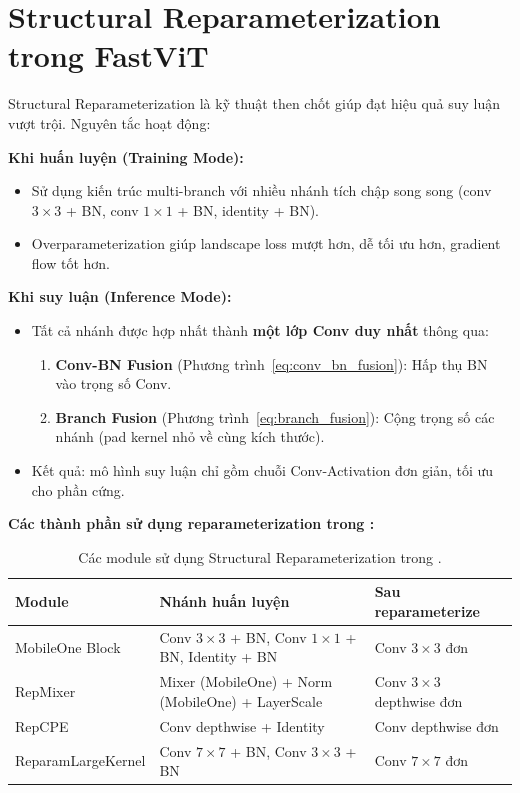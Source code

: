 \section{Structural Reparameterization trong FastViT}
\label{sec:reparameterization}

Structural Reparameterization là kỹ thuật then chốt giúp \fastvit{} đạt hiệu quả suy luận vượt trội. Nguyên tắc hoạt động:

\textbf{Khi huấn luyện (Training Mode):}
\begin{itemize}
    \item Sử dụng kiến trúc multi-branch với nhiều nhánh tích chập song song (conv $3 \times 3$ + BN, conv $1 \times 1$ + BN, identity + BN).
    \item Overparameterization giúp landscape loss mượt hơn, dễ tối ưu hơn, gradient flow tốt hơn.
\end{itemize}

\textbf{Khi suy luận (Inference Mode):}
\begin{itemize}
    \item Tất cả nhánh được hợp nhất thành \textbf{một lớp Conv duy nhất} thông qua:
    \begin{enumerate}
        \item \textbf{Conv-BN Fusion} (Phương trình~\ref{eq:conv_bn_fusion}): Hấp thụ BN vào trọng số Conv.
        \item \textbf{Branch Fusion} (Phương trình~\ref{eq:branch_fusion}): Cộng trọng số các nhánh (pad kernel nhỏ về cùng kích thước).
    \end{enumerate}
    \item Kết quả: mô hình suy luận chỉ gồm chuỗi Conv-Activation đơn giản, tối ưu cho phần cứng.
\end{itemize}

\textbf{Các thành phần sử dụng reparameterization trong \fastvit{}:}

\begin{table}[H]
\centering
\caption{Các module sử dụng Structural Reparameterization trong \fastvit{}.}
\label{tab:reparam_modules}
\begin{tabularx}{\textwidth}{l X X}
\toprule
\textbf{Module} & \textbf{Nhánh huấn luyện} & \textbf{Sau reparameterize} \\
\midrule
MobileOne Block & Conv $3 \times 3$ + BN, Conv $1 \times 1$ + BN, Identity + BN & Conv $3 \times 3$ đơn \\
RepMixer & Mixer (MobileOne) + Norm (MobileOne) + LayerScale & Conv $3 \times 3$ depthwise đơn \\
RepCPE & Conv depthwise + Identity & Conv depthwise đơn \\
ReparamLargeKernel & Conv $7 \times 7$ + BN, Conv $3 \times 3$ + BN & Conv $7 \times 7$ đơn \\
\bottomrule
\end{tabularx}
\end{table}

